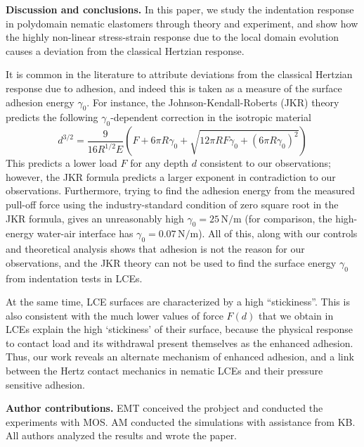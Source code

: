 \documentclass[12pt]{article}
\begin{document}
\vspace{0.15cm}
\noindent \textbf{Discussion and conclusions.} 
In this paper, we study the indentation response in polydomain nematic elastomers through theory and experiment, and show how the highly  non-linear stress-strain response due to the local domain evolution causes a deviation from the classical Hertzian response.

It is common in the literature to attribute deviations from the classical Hertzian response due to adhesion, and indeed this is taken as a measure of the surface adhesion energy $\gamma_0$. For instance, the Johnson-Kendall-Roberts (JKR) theory \cite{JKR,Israelachvili2016} predicts the following $\gamma_0$-dependent correction in the isotropic material
\begin{equation}
d^{3/2} = \frac{9}{16 R^{1/2}E} \left( F + 6\pi R \gamma_0 + \sqrt{12 \pi R F \gamma_0 + (6\pi R \gamma_0)^2} \right)  \nonumber
\end{equation}
This predicts a lower load $F$ for any depth $d$ consistent to our observations; however, the JKR formula predicts a larger exponent in contradiction to our observations.  Furthermore, trying to find the adhesion energy from the measured pull-off force using the industry-standard condition of zero square root in the JKR formula, gives an unreasonably high $\gamma_0=25\,\mathrm{N/m}$ \cite{Hiro2021} (for comparison, the high-energy water-air interface has $\gamma_0=0.07\,\mathrm{N/m}$). All of this, along with our controls and theoretical analysis shows that adhesion is not the reason for our observations, and the JKR theory can not be used to find the surface energy $\gamma_0$ from indentation tests in LCEs.  

At the same time, LCE surfaces are characterized by a high ``stickiness''.  This is also consistent with the  much lower values of force $F(d)$ that we obtain in LCEs explain the high `stickiness' of their surface, because the physical response to contact load and its withdrawal present themselves as the enhanced adhesion.   Thus, our work reveals an alternate mechanism of enhanced adhesion, and a link between the Hertz contact mechanics in nematic LCEs and their pressure sensitive adhesion.





\vspace{0.2in}
\noindent \textbf{Author contributions.}
EMT conceived the probject and conducted the experiments with MOS.  AM conducted the simulations with assistance from KB.  All authors analyzed the results and wrote the paper.
\end{document}
